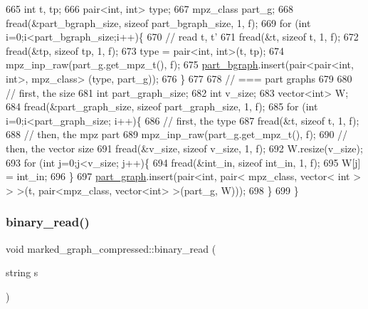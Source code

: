 \begin{DoxyCode}
665   \textcolor{keywordtype}{int} t, tp;
666   pair<int, int> type; 
667   mpz\_class part\_g; 
668   fread(&part\_bgraph\_size, \textcolor{keyword}{sizeof} part\_bgraph\_size, 1, f);
669   \textcolor{keywordflow}{for} (\textcolor{keywordtype}{int} i=0;i<part\_bgraph\_size;i++)\{
670     \textcolor{comment}{// read t, t'}
671     fread(&t, \textcolor{keyword}{sizeof} t, 1, f);
672     fread(&tp, \textcolor{keyword}{sizeof} tp, 1, f);
673     type = pair<int, int>(t, tp);
674     mpz\_inp\_raw(part\_g.get\_mpz\_t(), f);
675     \hyperlink{classmarked__graph__compressed_a7b3267063fba30b45eb21b3ba4e07536}{part\_bgraph}.insert(pair<pair<int, int>, mpz\_class> (type, part\_g));
676   \}
677 
678   \textcolor{comment}{// === part graphs}
679 
680   \textcolor{comment}{// first, the size}
681   \textcolor{keywordtype}{int} part\_graph\_size;
682   \textcolor{keywordtype}{int} v\_size;
683   vector<int> W; 
684   fread(&part\_graph\_size, \textcolor{keyword}{sizeof} part\_graph\_size, 1, f);
685   \textcolor{keywordflow}{for} (\textcolor{keywordtype}{int} i=0;i<part\_graph\_size; i++)\{
686     \textcolor{comment}{// first, the type}
687     fread(&t, \textcolor{keyword}{sizeof} t, 1, f);
688     \textcolor{comment}{// then, the mpz part}
689     mpz\_inp\_raw(part\_g.get\_mpz\_t(), f);
690     \textcolor{comment}{// then, the vector size}
691     fread(&v\_size, \textcolor{keyword}{sizeof} v\_size, 1, f);
692     W.resize(v\_size);
693     \textcolor{keywordflow}{for} (\textcolor{keywordtype}{int} j=0;j<v\_size; j++)\{
694       fread(&int\_in, \textcolor{keyword}{sizeof} int\_in, 1, f);
695       W[j] = int\_in;
696     \}
697     \hyperlink{classmarked__graph__compressed_ae179a4737e6eab905c18a94d44ef64b7}{part\_graph}.insert(pair<\textcolor{keywordtype}{int}, pair< mpz\_class, vector< int > > >(t, pair<mpz\_class, vector<int>
       >(part\_g, W)));
698   \}
699 \}
\end{DoxyCode}
\mbox{\label{classmarked__graph__compressed_a01c67fe4234738db6bb60459515c3ad8}} 
\subsubsection{\texorpdfstring{binary\+\_\+read()}{binary\_read()}\hspace{0.1cm}{\footnotesize\ttfamily [2/2]}}
{\footnotesize\ttfamily void marked\+\_\+graph\+\_\+compressed\+::binary\+\_\+read (\begin{DoxyParamCaption}\item[{string}]{s }\end{DoxyParamCaption})}

